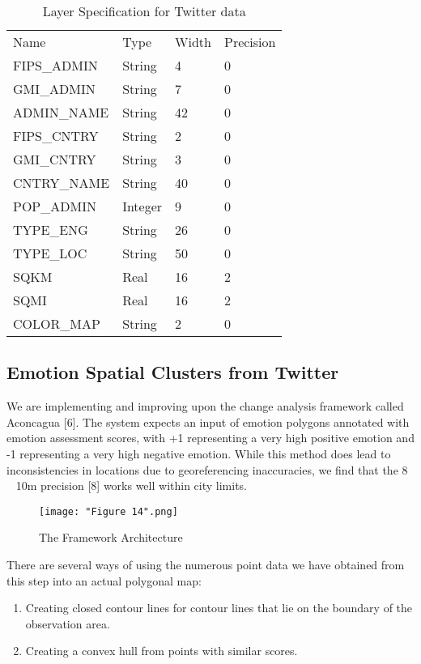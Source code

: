 \documentclass[conference]{IEEEtran}
\begin{document}
\begin{table}[]
\caption{Layer Specification for Twitter data}
\label{Table 2}
\centering
\begin{tabular}{llll}
Name        & Type    & Width & Precision \\
FIPS\_ADMIN & String  & 4     & 0         \\
GMI\_ADMIN  & String  & 7     & 0         \\
ADMIN\_NAME & String  & 42    & 0         \\
FIPS\_CNTRY & String  & 2     & 0         \\
GMI\_CNTRY  & String  & 3     & 0         \\
CNTRY\_NAME & String  & 40    & 0         \\
POP\_ADMIN  & Integer & 9     & 0         \\
TYPE\_ENG   & String  & 26    & 0         \\
TYPE\_LOC   & String  & 50    & 0         \\
SQKM        & Real    & 16    & 2         \\
SQMI        & Real    & 16    & 2         \\
COLOR\_MAP  & String  & 2     & 0        
\end{tabular}
\end{table}

\subsection{Emotion Spatial Clusters from Twitter }

We are implementing and improving upon the change analysis framework called Aconcagua [6]. The system expects an input of emotion polygons annotated with emotion assessment scores, with +1 representing a very high positive emotion and -1 representing a very high negative emotion. While this method does lead to inconsistencies in locations due to georeferencing inaccuracies, we find that the 8 ~ 10m precision [8] works well within city limits.

\begin{figure}[ht]
\centerline{\texttt{[image: "Figure 14".png]}}
\caption{The Framework Architecture}
\label{Figure 13}
\end{figure}


There are several ways of using the numerous point data we have obtained from this step into an actual polygonal map: 

\begin{enumerate}

\item Creating closed contour lines for contour lines that lie on the boundary of the observation area.
\item Creating a convex hull from points with similar scores.
\end{enumerate}
\end{document}
